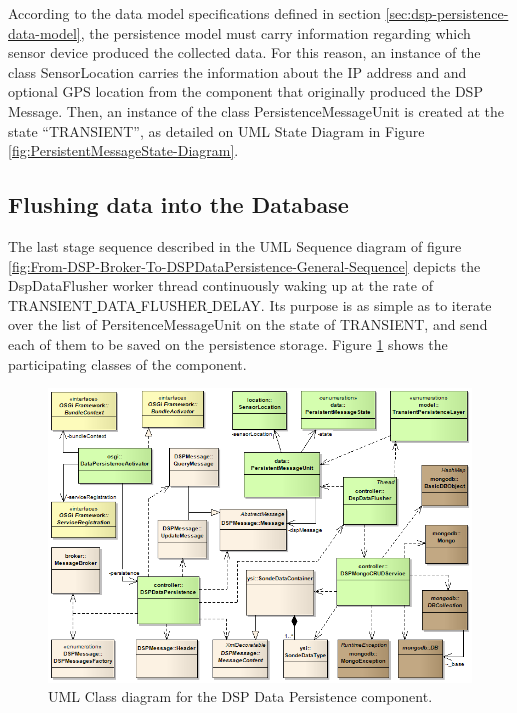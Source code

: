 According to the data model specifications defined in section
\ref{sec:dsp-persistence-data-model}, the persistence model must carry
information regarding which sensor device produced the collected data. For
this reason, an instance of the class SensorLocation carries the information
about the IP address and and optional GPS location from the component that
originally produced the DSP Message. Then, an instance of the class
PersistenceMessageUnit is created at the state ``TRANSIENT'', as detailed
on UML State Diagram \cite{uml} in Figure \ref{fig:PersistentMessageState-Diagram}.

\subsection{Flushing data into the Database}

The last stage sequence described in the UML Sequence diagram of figure
\ref{fig:From-DSP-Broker-To-DSPDataPersistence-General-Sequence} depicts the
DspDataFlusher worker thread continuously waking up at the rate of
TRANSIENT\underline{ }DATA\underline{ }FLUSHER\underline{ }DELAY. Its purpose
is as simple as to iterate over the list of PersitenceMessageUnit on the state
of TRANSIENT, and send each of them to be saved on the persistence storage.
Figure \ref{fig:DSP-Data-Persistence-Classes} shows the participating classes
of the component.

\begin{figure}[!b]
  \centering
  \includegraphics[scale=0.5]{../diagrams/DSP-Data-Persistence-Classes}
  \caption{UML Class diagram for the DSP Data Persistence component.}
  \label{fig:DSP-Data-Persistence-Classes}
\end{figure}

